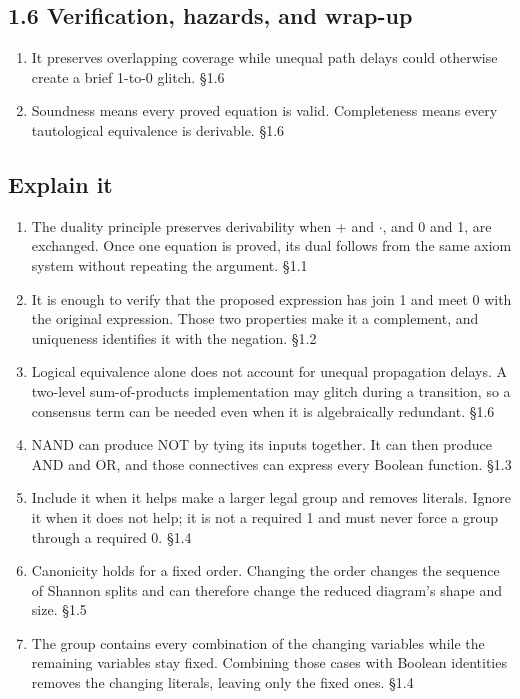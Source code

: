 \documentclass[11pt]{article}
\begin{document}
\begin{keepsection}\subsection{1.6 Verification, hazards, and wrap-up}

\begin{enumerate}
\item It preserves overlapping coverage while unequal path delays could otherwise create a brief 1-to-0 glitch. \hfill{\small\color{FAUblue}§1.6}
\item Soundness means every proved equation is valid. Completeness means every tautological equivalence is derivable. \hfill{\small\color{FAUblue}§1.6}
\end{enumerate}

\end{keepsection}
\begin{keepsection}\subsection{Explain it}

\begin{enumerate}
\item The duality principle preserves derivability when + and \ensuremath{\cdot}, and 0 and 1, are exchanged. Once one equation is proved, its dual follows from the same axiom system without repeating the argument. \hfill{\small\color{FAUblue}§1.1}
\item It is enough to verify that the proposed expression has join 1 and meet 0 with the original expression. Those two properties make it a complement, and uniqueness identifies it with the negation. \hfill{\small\color{FAUblue}§1.2}
\item Logical equivalence alone does not account for unequal propagation delays. A two-level sum-of-products implementation may glitch during a transition, so a consensus term can be needed even when it is algebraically redundant. \hfill{\small\color{FAUblue}§1.6}
\item NAND can produce NOT by tying its inputs together. It can then produce AND and OR, and those connectives can express every Boolean function. \hfill{\small\color{FAUblue}§1.3}
\item Include it when it helps make a larger legal group and removes literals. Ignore it when it does not help; it is not a required 1 and must never force a group through a required 0. \hfill{\small\color{FAUblue}§1.4}
\item Canonicity holds for a fixed order. Changing the order changes the sequence of Shannon splits and can therefore change the reduced diagram’s shape and size. \hfill{\small\color{FAUblue}§1.5}
\item The group contains every combination of the changing variables while the remaining variables stay fixed. Combining those cases with Boolean identities removes the changing literals, leaving only the fixed ones. \hfill{\small\color{FAUblue}§1.4}
\end{enumerate}

\end{keepsection}
\end{document}
